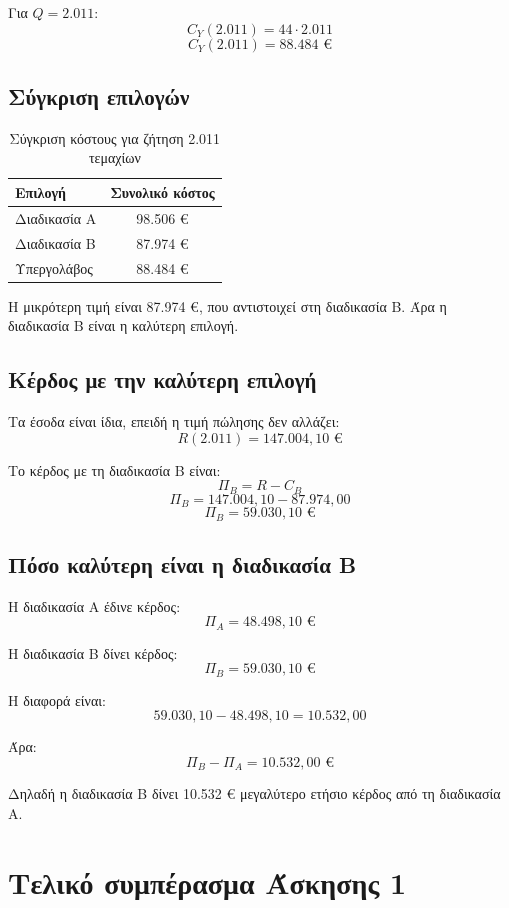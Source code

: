 \documentclass[12pt,a4paper]{article}
\begin{document}
Για \(Q=2.011\):
\[
C_Y(2.011)=44\cdot2.011
\]
\[
C_Y(2.011)=88.484 \text{ €}
\]

\subsection{Σύγκριση επιλογών}

\begin{table}[H]
\centering
\caption{Σύγκριση κόστους για ζήτηση 2.011 τεμαχίων}
\begin{tabular}{lc}
\toprule
\textbf{Επιλογή} & \textbf{Συνολικό κόστος} \\
\midrule
Διαδικασία Α & 98.506 € \\
Διαδικασία Β & 87.974 € \\
Υπεργολάβος & 88.484 € \\
\bottomrule
\end{tabular}
\end{table}

Η μικρότερη τιμή είναι 87.974 €, που αντιστοιχεί στη διαδικασία Β. Άρα η διαδικασία Β είναι η καλύτερη επιλογή.

\subsection{Κέρδος με την καλύτερη επιλογή}

Τα έσοδα είναι ίδια, επειδή η τιμή πώλησης δεν αλλάζει:
\[
R(2.011)=147.004{,}10 \text{ €}
\]

Το κέρδος με τη διαδικασία Β είναι:
\[
\Pi_B=R-C_B
\]
\[
\Pi_B=147.004{,}10-87.974{,}00
\]
\[
\boxed{\Pi_B=59.030{,}10 \text{ €}}
\]

\subsection{Πόσο καλύτερη είναι η διαδικασία Β}

Η διαδικασία Α έδινε κέρδος:
\[
\Pi_A=48.498{,}10 \text{ €}
\]

Η διαδικασία Β δίνει κέρδος:
\[
\Pi_B=59.030{,}10 \text{ €}
\]

Η διαφορά είναι:
\[
59.030{,}10-48.498{,}10=10.532{,}00
\]

Άρα:
\[
\boxed{\Pi_B-\Pi_A=10.532{,}00 \text{ €}}
\]

Δηλαδή η διαδικασία Β δίνει 10.532 € μεγαλύτερο ετήσιο κέρδος από τη διαδικασία Α.

\section{Τελικό συμπέρασμα Άσκησης 1}
\end{document}
